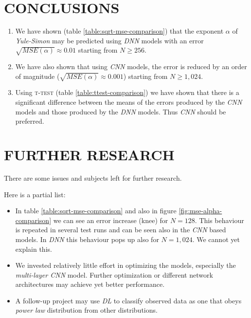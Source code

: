 \documentclass[a4paper, 12pt]{report}
\begin{document}
\section{CONCLUSIONS}

\begin{enumerate}
\small
    \item We have shown (table \ref{table:sqrt-mse-comparison}) that the exponent $\alpha$ of \textit{Yule-Simon} may be predicted using \textit{DNN} models with an error $\sqrt{MSE(\alpha)} \approx 0.01$ starting from $N \geq 256$.
    
    \item We have also shown that using \textit{CNN} models, the error is reduced by an order of magnitude ($\sqrt{MSE(\alpha)} \approx 0.001$) starting from $N \geq 1,024$.
    
    \item Using \textsc{t-test} (table \ref{table:ttest-comparison}) we have shown that there is a significant difference between the means of the errors produced by the \textit{CNN} models and those produced by the \textit{DNN} models. Thus \textit{CNN} should be preferred.
\end{enumerate}

\section{FURTHER RESEARCH}
There are some issues and subjects left for further research.

Here is a partial list:

\begin{itemize}
\small
    \item In table \ref{table:sqrt-mse-comparison} and also in figure \ref{fig:mse-alpha-comparison} we can see an error increase (knee) for $N=128$. This behaviour is repeated in several test runs and can be seen also in the \textit{CNN} based models. In \textit{DNN} this behaviour pops up also for $N=1,024$. We cannot yet explain this.
    
    \item We invested relatively little effort in optimizing the models, especially the \textit{multi-layer CNN} model. Further optimization or different network architectures may achieve yet better performance.
    
    \item A follow-up project may use \textit{DL} to classify observed data as one that obeys \textit{power law} distribution from other distributions.
\end{itemize}
\end{document}
